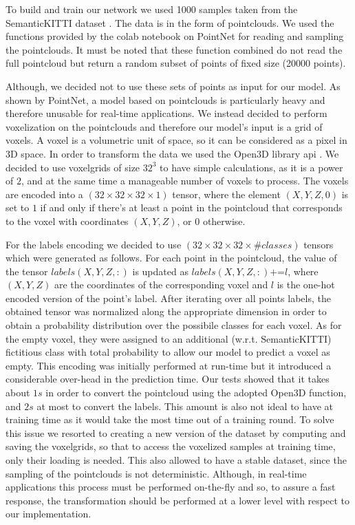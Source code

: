To build and train our network we used 1000 samples taken from the SemanticKITTI dataset \cite{behley2019iccv}.
The data is in the form of pointclouds. We used the
functions provided by the colab notebook on PointNet for reading and sampling the pointclouds. It must be noted that these function combined
do not read the full pointcloud but return a random subset of points of fixed size (20000 points).\par
Although, we decided not to use these sets of points as input for our model. As shown by PointNet,
a model based on pointclouds is particularly heavy and therefore unusable for real-time applications.
We instead decided to perform voxelization on the pointclouds and therefore our model's input is a grid of voxels.
A voxel is a volumetric unit of space, so it can be considered as a pixel in 3D space.
In order to transform the data we used the Open3D library api \cite{zhou2018open3d}. 
We decided to use voxelgrids of size $32^3$ to have simple calculations, as it is a power of $2$, and at the same time a manageable number of voxels to process.
The voxels are encoded into a $(32\times32\times32\times1)$ tensor, where the element $(X,Y,Z,0)$ is set to $1$ if and only if there's at least a point in the pointcloud that corresponds to the voxel with coordinates $(X,Y,Z)$, or 0 otherwise.\par
For the labels encoding we decided to use $(32\times32\times32\times\#classes)$ tensors which were generated as follows.
For each point in the pointcloud, the value of the tensor 
$labels(X,Y,Z,:)$ is updated as $labels(X,Y,Z,:)\textrm{+=}l$, where $(X,Y,Z)$ are the coordinates of the corresponding voxel and $l$ is the one-hot encoded version
of the point's label.
After iterating over all points labels, the obtained tensor was normalized along the appropriate dimension in order to obtain a probability distribution over the possibile classes for each voxel. 
As for the empty voxel, they were assigned to an additional (w.r.t. SemanticKITTI) fictitious class with total probability to 
allow our model to predict a voxel as empty.
This encoding was initially performed at run-time but it introduced a considerable over-head in the prediction time. 
Our tests showed that it takes about $1s$ in order to convert the pointcloud
using the adopted Open3D function, and $2s$ at most to convert the labels. This amount
is also not ideal to have at training time as it would take the most time out of a training round. 
To solve this issue we resorted to creating a new version of the dataset by computing and saving the voxelgrids, so that to access the voxelized samples
at training time, only their loading is needed. This also allowed to have a stable dataset, since the sampling of the pointclouds
is not deterministic. Although, in real-time applications this process must be performed on-the-fly and so, to assure a fast response,
the transformation should be performed at a lower level with respect to our implementation.